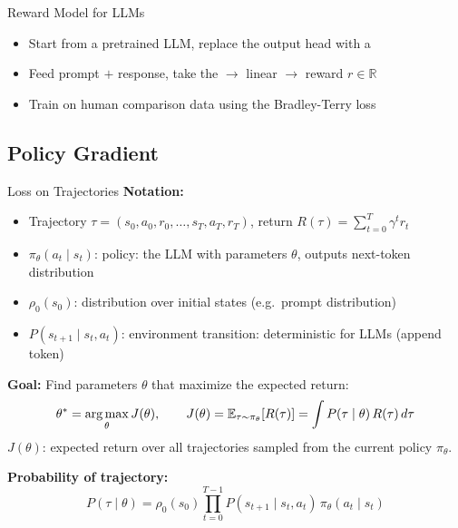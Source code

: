 \begin{frame}{Reward Model for LLMs}
  \vspace{-0.3em}
  \begin{itemize}[nosep]
    \item Start from a pretrained LLM, replace the output head with a 
    \item Feed prompt $+$ response, take the  $\to$ linear $\to$ reward $r \in \mathbb{R}$
    \item Train on human comparison data using the Bradley-Terry loss
  \end{itemize}
\end{frame}

\subsection{Policy Gradient}

\begin{frame}{Loss on Trajectories}
  \textbf{Notation:}
  \begin{itemize}[nosep]
    \item Trajectory $\tau = (s_0, a_0, r_0, \ldots, s_T, a_T, r_T)$, \quad return $R(\tau) = \sum_{t=0}^{T} \gamma^t r_t$
    \item $\pi_\theta(a_t \mid s_t)$: policy: the LLM with parameters $\theta$, outputs next-token distribution
    \item $\rho_0(s_0)$: distribution over initial states (e.g.\ prompt distribution)
    \item $P(s_{t+1} \mid s_t, a_t)$: environment transition: deterministic for LLMs (append token)
  \end{itemize}

  \vspace{0.3em}
  \textbf{Goal:} Find parameters $\theta$ that maximize the expected return:
  \[
    \theta^* = \operatorname*{arg\,max}_\theta J(\theta), \qquad J(\theta) = \mathbb{E}_{\tau \sim \pi_\theta}[R(\tau)] = \int P(\tau \mid \theta) \, R(\tau) \, d\tau
  \]
  $J(\theta)$: expected return over all trajectories sampled from the current policy $\pi_\theta$.

  \vspace{0.3em}
  \textbf{Probability of trajectory:}
  \[
    P(\tau \mid \theta) = \rho_0(s_0) \prod_{t=0}^{T-1} P(s_{t+1} \mid s_t, a_t) \, \pi_\theta(a_t \mid s_t)
  \]
\end{frame}

